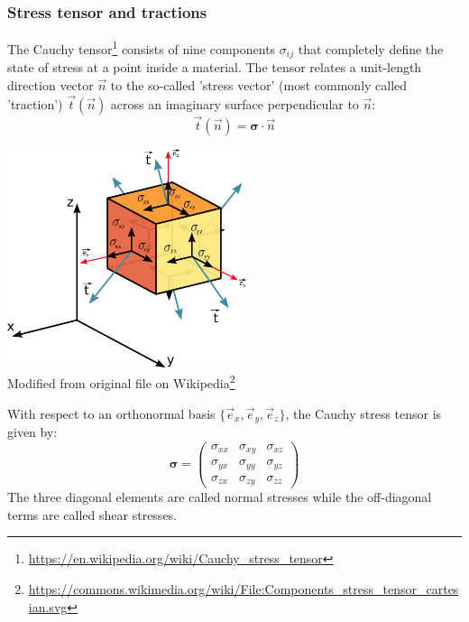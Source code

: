 \subsubsection{Stress tensor and tractions}\label{sec:stresstensor}

The Cauchy tensor\footnote{\url{https://en.wikipedia.org/wiki/Cauchy_stress_tensor}} 
consists of nine components $\sigma_{ij}$  that completely define the state of stress 
at a point inside a material. 
The tensor relates a unit-length direction vector $\vec{n}$ to the so-called 'stress vector' (most commonly called 'traction') $\vec{t}(\vec{n})$ across an imaginary surface perpendicular to $\vec{n}$:
\[
\vec{t}(\vec n)= {\bm \sigma}\cdot {\vec n}
\]

\begin{center}
\includegraphics[width=7cm]{images/contmech/Components_stress_tensor_cartesian}\\
{\scriptsize Modified from original 
file on Wikipedia\footnote{\url{https://commons.wikimedia.org/wiki/File:Components_stress_tensor_cartesian.svg}}}
\end{center}

\noindent 
With respect to an orthonormal basis $\{\vec{e}_x,\vec{e}_y,\vec{e}_z\}$, the Cauchy stress tensor
is given by:
\begin{equation}
{\bm \sigma}=
\left(
\begin{array}{ccc}
\sigma_{xx} & \sigma_{xy} & \sigma_{xz} \\
\sigma_{yx} & \sigma_{yy} & \sigma_{yz} \\
\sigma_{zx} & \sigma_{zy} & \sigma_{zz} 
\end{array}
\right)
\end{equation}
The three diagonal elements are called normal stresses while the off-diagonal terms 
are called shear stresses.

